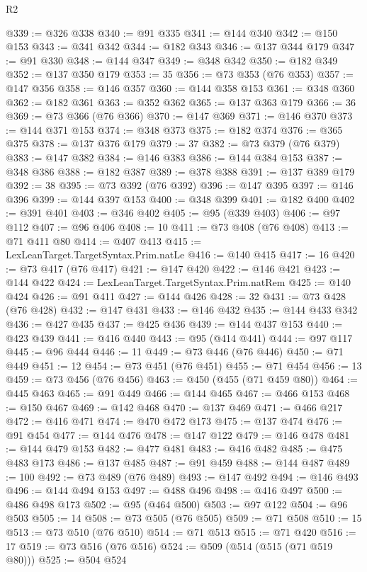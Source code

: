 \begin{lexlean}{R2}
\begin{coremodule}
@339 := @326 @338
@340 := @91 @335
@341 := @144 @340
@342 := @150 @153
@343 := @341 @342
@344 := @182 @343
@346 := @137 @344 @179
@347 := @91 @330
@348 := @144 @347
@349 := @348 @342
@350 := @182 @349
@352 := @137 @350 @179
@353 := 35
@356 := @73 @353 (@76 @353)
@357 := @147 @356
@358 := @146 @357
@360 := @144 @358 @153
@361 := @348 @360
@362 := @182 @361
@363 := @352 @362
@365 := @137 @363 @179
@366 := 36
@369 := @73 @366 (@76 @366)
@370 := @147 @369
@371 := @146 @370
@373 := @144 @371 @153
@374 := @348 @373
@375 := @182 @374
@376 := @365 @375
@378 := @137 @376 @179
@379 := 37
@382 := @73 @379 (@76 @379)
@383 := @147 @382
@384 := @146 @383
@386 := @144 @384 @153
@387 := @348 @386
@388 := @182 @387
@389 := @378 @388
@391 := @137 @389 @179
@392 := 38
@395 := @73 @392 (@76 @392)
@396 := @147 @395
@397 := @146 @396
@399 := @144 @397 @153
@400 := @348 @399
@401 := @182 @400
@402 := @391 @401
@403 := @346 @402
@405 := @95 (@339 @403)
@406 := @97 @112
@407 := @96 @406
@408 := 10
@411 := @73 @408 (@76 @408)
@413 := @71 @411 @80
@414 := @407 @413
@415 := LexLeanTarget.TargetSyntax.Prim.natLe
@416 := @140 @415
@417 := 16
@420 := @73 @417 (@76 @417)
@421 := @147 @420
@422 := @146 @421
@423 := @144 @422
@424 := LexLeanTarget.TargetSyntax.Prim.natRem
@425 := @140 @424
@426 := @91 @411
@427 := @144 @426
@428 := 32
@431 := @73 @428 (@76 @428)
@432 := @147 @431
@433 := @146 @432
@435 := @144 @433 @342
@436 := @427 @435
@437 := @425 @436
@439 := @144 @437 @153
@440 := @423 @439
@441 := @416 @440
@443 := @95 (@414 @441)
@444 := @97 @117
@445 := @96 @444
@446 := 11
@449 := @73 @446 (@76 @446)
@450 := @71 @449
@451 := 12
@454 := @73 @451 (@76 @451)
@455 := @71 @454
@456 := 13
@459 := @73 @456 (@76 @456)
@463 := @450 (@455 (@71 @459 @80))
@464 := @445 @463
@465 := @91 @449
@466 := @144 @465
@467 := @466 @153
@468 := @150 @467
@469 := @142 @468
@470 := @137 @469
@471 := @466 @217
@472 := @416 @471
@474 := @470 @472 @173
@475 := @137 @474
@476 := @91 @454
@477 := @144 @476
@478 := @147 @122
@479 := @146 @478
@481 := @144 @479 @153
@482 := @477 @481
@483 := @416 @482
@485 := @475 @483 @173
@486 := @137 @485
@487 := @91 @459
@488 := @144 @487
@489 := 100
@492 := @73 @489 (@76 @489)
@493 := @147 @492
@494 := @146 @493
@496 := @144 @494 @153
@497 := @488 @496
@498 := @416 @497
@500 := @486 @498 @173
@502 := @95 (@464 @500)
@503 := @97 @122
@504 := @96 @503
@505 := 14
@508 := @73 @505 (@76 @505)
@509 := @71 @508
@510 := 15
@513 := @73 @510 (@76 @510)
@514 := @71 @513
@515 := @71 @420
@516 := 17
@519 := @73 @516 (@76 @516)
@524 := @509 (@514 (@515 (@71 @519 @80)))
@525 := @504 @524

\end{coremodule}
\end{lexlean}
